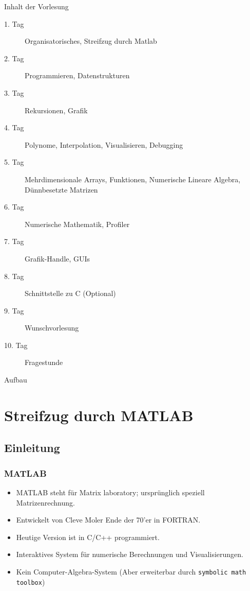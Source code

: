 \documentclass[hyperref={xetex}]{beamer}
\begin{document}
\begin{frame}{Inhalt der Vorlesung}
\begin{description}
 \item[1. Tag] Organisatorisches, Streifzug durch Matlab
\item [2. Tag] Programmieren, Datenstrukturen
\item [3. Tag] Rekursionen, Grafik
\item [4. Tag] Polynome, Interpolation, Visualisieren, Debugging
\item [5. Tag] Mehrdimensionale Arrays, Funktionen, Numerische Lineare Algebra, Dünnbesetzte Matrizen
\item [6. Tag] Numerische Mathematik, Profiler
\item [7. Tag] Grafik-Handle, GUIs
\item [8. Tag] Schnittstelle zu C (Optional)
\item [9. Tag] Wunschvorlesung
\item [10. Tag] Fragestunde
\end{description}
\end{frame}

\begin{frame}{Aufbau}
\tableofcontents
\end{frame}

\section{Streifzug durch MATLAB}

\subsection{Einleitung}
\begin{frame}[fragile]\frametitle{MATLAB}

\begin{itemize}
\item MATLAB steht für \alert{Mat}rix \alert{lab}oratory; ursprünglich speziell Matrizenrechnung.
\item Entwickelt von Cleve Moler Ende der 70'er in FORTRAN.
\item Heutige Version ist in C/C++ programmiert.
\item Interaktives System für numerische Berechnungen und Visualisierungen.
\item Kein Computer-Algebra-System (Aber erweiterbar durch \texttt{symbolic math toolbox})
\end{itemize}
\end{frame}
\end{document}
